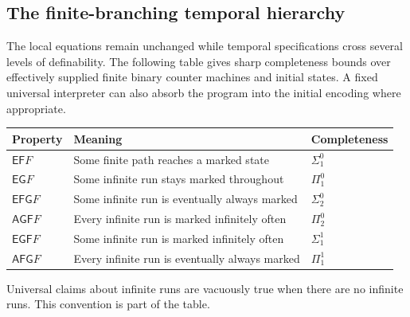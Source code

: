 \documentclass[11pt,letterpaper]{article}
\theoremstyle{definition}
\theoremstyle{remark}
\newcommand{\EF}{\mathsf{EF}}
\newcommand{\EG}{\mathsf{EG}}
\newcommand{\EGF}{\mathsf{EGF}}
\newcommand{\EFG}{\mathsf{EFG}}
\newcommand{\AGF}{\mathsf{AGF}}
\newcommand{\AFG}{\mathsf{AFG}}
\newcommand{\1}{\mathbf 1}
\newcommand{\srctag}[1]{\texorpdfstring{\hspace{0.4em}{\normalfont\small\color{accent}[source #1]}}{ [source #1]}}
\begin{document}
\subsection{The finite-branching temporal hierarchy\srctag{11}}\label{lbh:ql:sec:hierarchy}
The local equations remain unchanged while temporal specifications cross
several levels of definability. The following table gives sharp completeness
bounds over effectively supplied finite binary counter machines and initial
states. A fixed universal interpreter can also absorb the program into the
initial encoding where appropriate.
\begin{center}
\begin{tabularx}{\textwidth}{@{}lXl@{}}
\toprule
Property & Meaning & Completeness\\
\midrule
$\EF F$ & Some finite path reaches a marked state & $\Sigma^0_1$\\
$\EG F$ & Some infinite run stays marked throughout & $\Pi^0_1$\\
$\EFG F$ & Some infinite run is eventually always marked & $\Sigma^0_2$\\
$\AGF F$ & Every infinite run is marked infinitely often & $\Pi^0_2$\\
$\EGF F$ & Some infinite run is marked infinitely often & $\Sigma^1_1$\\
$\AFG F$ & Every infinite run is eventually always marked & $\Pi^1_1$\\
\bottomrule
\end{tabularx}
\end{center}
Universal claims about infinite runs are vacuously true when there are no
infinite runs. This convention is part of the table.
\end{document}

